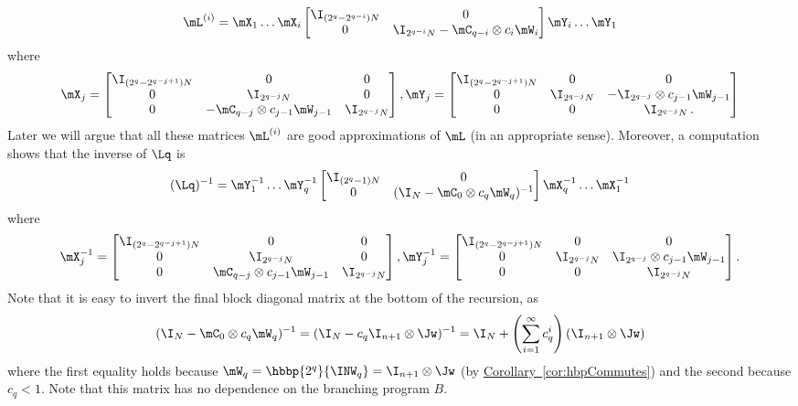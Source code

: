 \documentclass[11pt]{article}
\newcommand{\expref}[2]{\texorpdfstring{\hyperref[#2]{#1~\ref{#2}}}{#1~\ref{#2}}}
\begin{document}
\begin{equation}
    \mL^{(i)}=\mX_1\dots \mX_i\begin{bmatrix}\I_{(2^q-2^{q-i})N} & 0\\ 0 & \I_{2^{q-i}N}-\mC_{q-i}\otimes c_i\mW_i\end{bmatrix}\mY_i\dots \mY_1 \label{eqn:Lq}%
\end{equation}
%
where %
\[\mX_j=\begin{bmatrix} \I_{(2^q-2^{q-j+1})N} & 0 & 0\\
0 & \I_{2^{q-j}N} & 0\\
0 & -\mC_{q-j}\otimes c_{j-1}\mW_{j-1} & \I_{2^{q-j}N}
\end{bmatrix},\\
\mY_j=\begin{bmatrix} \I_{(2^q-2^{q-j+1})N} & 0 & 0\\
0 & \I_{2^{q-j}N} & -\I_{2^{q-j}}\otimes c_{j-1}\mW_{j-1}\\
0 & 0 & \I_{2^{q-j}N}\,. %
\end{bmatrix}\]
Later we will argue that all these matrices $\mL^{(i)}$%
are good approximations of $\mL$ (in an appropriate sense). Moreover, 
a computation shows that the inverse of $\Lq$ is
%
\begin{equation}\label{eqn:Lqinv}
    (\Lq)^{-1} = \mY_1^{-1}\dots \mY_q^{-1}\begin{bmatrix}\I_{(2^q-1)N} & 0\\ 0 & (\I_{N}-\mC_{0}\otimes c_q \mW_q)^{-1}\end{bmatrix}\mX_q^{-1}\dots \mX_1^{-1}%
\end{equation}
%
where %
\[\mX_j^{-1}=\begin{bmatrix} \I_{(2^q-2^{q-j+1})N} & 0 & 0\\
0 & \I_{2^{q-j}N} & 0\\
0 & \mC_{q-j}\otimes c_{j-1}\mW_{j-1} & \I_{2^{q-j}N}
\end{bmatrix}, 
\mY_j^{-1}=\begin{bmatrix} \I_{(2^q-2^{q-j+1})N} & 0 & 0\\
0 & \I_{2^{q-j}N} & \I_{2^{q-j}}\otimes c_{j-1}\mW_{j-1}\\
0 & 0 & \I_{2^{q-j}N}
\end{bmatrix}.\]
Note that it is easy to invert the final block diagonal matrix at the bottom of the recursion, as
$$(\I_{N}-\mC_{0}\otimes c_q \mW_q)^{-1}=(\I_N-c_q\I_{n+1}\otimes \Jw)^{-1}=\I_N+\left(\sum_{i=1}^\infty c_q^i\right)(\I_{n+1}\otimes \Jw)$$ 
where the first equality holds because $\mW_q = \hbbp{2^q}{\INW_q}=\I_{n+1}\otimes\Jw$ (by \expref{Corollary}{cor:hbpCommutes}) and the second because $c_q<1$. Note that this matrix has no dependence on the branching program $B$.
\end{document}
